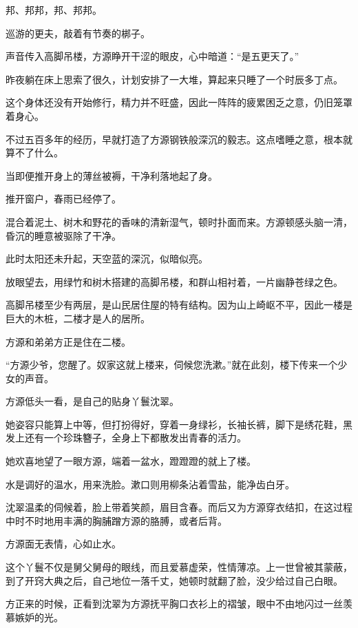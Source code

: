 
\begin{this_body}

邦、邦邦，邦、邦邦。

巡游的更夫，敲着有节奏的梆子。

声音传入高脚吊楼，方源睁开干涩的眼皮，心中暗道：“是五更天了。”

昨夜躺在床上思索了很久，计划安排了一大堆，算起来只睡了一个时辰多丁点。

这个身体还没有开始修行，精力并不旺盛，因此一阵阵的疲累困乏之意，仍旧笼罩着身心。

不过五百多年的经历，早就打造了方源钢铁般深沉的毅志。这点嗜睡之意，根本就算不了什么。

当即便推开身上的薄丝被褥，干净利落地起了身。

推开窗户，春雨已经停了。

混合着泥土、树木和野花的香味的清新湿气，顿时扑面而来。方源顿感头脑一清，昏沉的睡意被驱除了干净。

此时太阳还未升起，天空蓝的深沉，似暗似亮。

放眼望去，用绿竹和树木搭建的高脚吊楼，和群山相衬着，一片幽静苍绿之色。

高脚吊楼至少有两层，是山民居住屋的特有结构。因为山上崎岖不平，因此一楼是巨大的木桩，二楼才是人的居所。

方源和弟弟方正是住在二楼。

“方源少爷，您醒了。奴家这就上楼来，伺候您洗漱。”就在此刻，楼下传来一个少女的声音。

方源低头一看，是自己的贴身丫鬟沈翠。

她姿容只能算上中等，但打扮得好，穿着一身绿衫，长袖长裤，脚下是绣花鞋，黑发上还有一个珍珠簪子，全身上下都散发出青春的活力。

她欢喜地望了一眼方源，端着一盆水，蹬蹬蹬的就上了楼。

水是调好的温水，用来洗脸。漱口则用柳条沾着雪盐，能净齿白牙。

沈翠温柔的伺候着，脸上带着笑颜，眉目含春。而后又为方源穿衣结扣，在这过程中时不时地用丰满的胸脯蹭方源的胳膊，或者后背。

方源面无表情，心如止水。

这个丫鬟不仅是舅父舅母的眼线，而且爱慕虚荣，性情薄凉。上一世曾被其蒙蔽，到了开窍大典之后，自己地位一落千丈，她顿时就翻了脸，没少给过自己白眼。

方正来的时候，正看到沈翠为方源抚平胸口衣衫上的褶皱，眼中不由地闪过一丝羡慕嫉妒的光。


\end{this_body}
